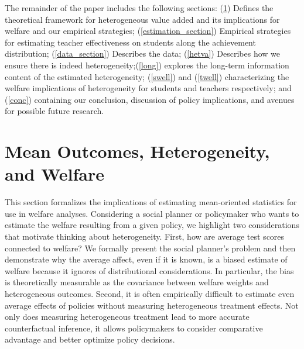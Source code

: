 \documentclass[12pt]{article}
\theoremstyle{definition}
\theoremstyle{definition}
\theoremstyle{definition}
\theoremstyle{definition}
\begin{document}
    The remainder of the paper includes the following sections: (\ref{theory_setion}) Defines the theoretical framework for heterogeneous value added and its implications for welfare and our empirical strategies; (\ref{estimation_section}) Empirical strategies for estimating teacher effectiveness on students along the achievement distribution; (\ref{data_section}) Describes the data; (\ref{hetva}) Describes how we ensure there is indeed heterogeneity;(\ref{long}) explores the long-term information content of the estimated heterogeneity; (\ref{swell}) and (\ref{twell}) characterizing the welfare implications of heterogeneity for students and teachers respectively; and (\ref{conc}) containing our conclusion, discussion of policy implications, and avenues for possible future research.

    
    


\section{Mean Outcomes, Heterogeneity, and Welfare}
\label{theory_setion}


    This section formalizes the implications of estimating mean-oriented statistics for use in welfare analyses. Considering a social planner or policymaker who wants to estimate the welfare resulting from a given policy, we highlight two considerations that motivate thinking about heterogeneity. First, how are average test scores connected to welfare? We formally present the social planner's problem and then demonstrate why the average affect, even if it is known, is a biased estimate of welfare because it ignores of distributional considerations. In particular, the bias is theoretically measurable as the covariance between welfare weights and heterogeneous outcomes. Second, it is often empirically difficult to estimate even average effects of policies without measuring heterogeneous treatment effects. Not only does measuring heterogeneous treatment lead to more accurate counterfactual inference, it allows policymakers to consider comparative advantage and better optimize policy decisions. 
    
\end{document}

